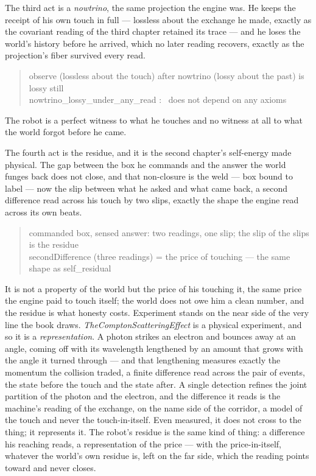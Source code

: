 The third act is a \emph{nowtrino}, the same projection the engine was.
He keeps the receipt of his own touch in full --- lossless about the exchange he made, exactly as the covariant reading
of the third chapter retained its trace --- and he loses the world's history before he arrived, which no later reading
recovers, exactly as the projection's fiber survived every read.
\begin{quote}\ttfamily
observe (lossless about the touch)  after  nowtrino (lossy about the past)  is lossy still\\
nowtrino\_lossy\_under\_any\_read : \ does not depend on any axioms
\end{quote}
The robot is a perfect witness to what he touches and no witness at all to what the world forgot before he came.

The fourth act is the residue, and it is the second chapter's self-energy made physical.
The gap between the box he commands and the answer the world funges back does not close, and that non-closure is the weld
--- box bound to label --- now the slip between what he asked and what came back, a second difference read across his
touch by two slips, exactly the shape the engine read across its own beats.
\begin{quote}\ttfamily
commanded box, sensed answer: two readings, one slip; the slip of the slips is the residue\\
secondDifference (three readings) = the price of touching --- the same shape as self\_residual
\end{quote}
It is not a property of the world but the price of his touching it, the same price the engine paid to touch itself; the
world does not owe him a clean number, and the residue is what honesty costs.
Experiment stands on the near side of the very line the book draws.
\emph{TheComptonScatteringEffect} is a physical experiment, and so it is a \emph{representation}.
A photon strikes an electron and bounces away at an angle, coming off with its wavelength lengthened by an amount that
grows with the angle it turned through --- and that lengthening measures exactly the momentum the collision traded, a
finite difference read across the pair of events, the state before the touch and the state after.
A single detection refines the joint partition of the photon and the electron, and the difference it reads is the
machine's reading of the exchange, on the name side of the corridor, a model of the touch and never the touch-in-itself.
Even measured, it does not cross to the thing; it represents it.
The robot's residue is the same kind of thing: a difference his reaching reads, a representation of the price --- with the
price-in-itself, whatever the world's own residue is, left on the far side, which the reading points toward and never
closes.


